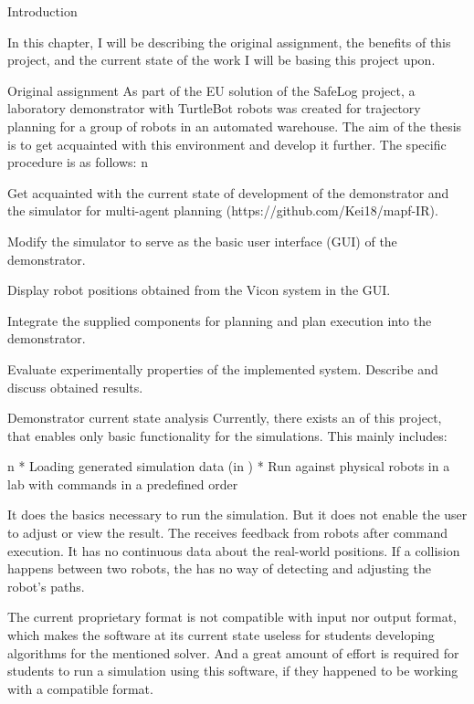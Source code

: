\chap Introduction

In this chapter, I will be describing the original assignment, the benefits of this project, and the current state of the work I will be basing this project upon.

\sec Original assignment
As part of the EU solution of the SafeLog project, a laboratory demonstrator with TurtleBot robots was created for trajectory planning for a group of robots in an automated warehouse. The aim of the thesis is to get acquainted with this environment and develop it further. The specific procedure is as follows:
\begitems \style n
    \item Get acquainted with the current state of development of the demonstrator and the simulator for multi-agent planning (https://github.com/Kei18/mapf-IR).
    \item Modify the simulator to serve as the basic user interface (GUI) of the demonstrator.
    \item Display robot positions obtained from the Vicon system in the GUI.
    \item Integrate the supplied components for planning and plan execution into the demonstrator.
    \item Evaluate experimentally properties of the implemented system. Describe and discuss obtained results.
\enditems

\sec Demonstrator current state analysis
Currently, there exists an {\oldRepo} of this project, that enables only basic functionality for the simulations. This mainly includes:

\begitems \style n
    * Loading generated simulation data (in {\oldFormat})
    * Run against physical robots in a lab with commands in a predefined order
\enditems

It does the basics necessary to run the simulation. But it does not enable the user to adjust or view the result. The {\oldRepo} receives feedback from robots after command execution. It has no continuous data about the real-world positions. If a collision happens between two robots, the {\oldRepo} has no way of detecting and adjusting the robot's paths.

The current proprietary format is not compatible with {\mapfIR} input nor output format, which makes the software at its current state useless for students developing algorithms for the mentioned solver. And a great amount of effort is required for students to run a simulation using this software, if they happened to be working with a compatible format.

